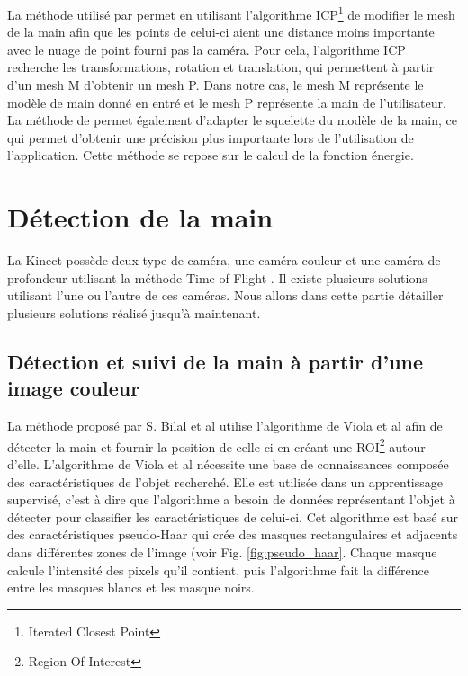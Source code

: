 La méthode utilisé par \cite{export:217428} permet en utilisant l'algorithme
ICP\footnote{Iterated Closest Point} \cite{121791} de modifier le mesh de la main afin
que les points de celui-ci aient une distance moins importante avec le nuage de point fourni pas la 
caméra. Pour cela, l'algorithme ICP recherche les transformations, rotation et translation, qui permettent 
à partir d'un mesh M d'obtenir un mesh P. Dans notre cas, le mesh M représente le modèle de main donné en entré
et le mesh P représente la main de l'utilisateur.\\ 

La méthode de \cite{export:217428} permet également d'adapter le squelette du modèle de la 
main, ce qui permet d'obtenir une précision plus importante lors de l'utilisation de l'application.
Cette méthode se repose sur le calcul de la fonction énergie.

\section{Détection de la main}

La Kinect possède deux type de caméra, une caméra couleur et une caméra de profondeur utilisant la méthode 
\og Time of Flight \fg. Il existe plusieurs solutions utilisant l'une ou l'autre de ces caméras. Nous allons
dans cette partie détailler plusieurs solutions réalisé jusqu'à maintenant.

\subsection{Détection et suivi de la main à partir d'une image couleur}
La méthode proposé par S. Bilal et al \cite{} utilise l'algorithme de Viola et al \cite{viola2001jones} afin
de détecter la main et fournir la position de celle-ci en créant une ROI\footnote{Region Of Interest} autour d'elle.
L'algorithme de Viola et al \cite{viola2001jones} nécessite une 
base de connaissances composée des caractéristiques de l'objet recherché. Elle est utilisée dans un 
apprentissage supervisé, c'est à dire que l'algorithme a besoin de données représentant
l'objet à détecter pour classifier les caractéristiques de celui-ci. Cet algorithme est basé sur des caractéristiques 
pseudo-Haar qui crée des masques rectangulaires et adjacents dans différentes zones de l'image (voir Fig. \ref{fig:pseudo_haar}. 
Chaque masque calcule l'intensité des pixels qu'il contient, puis l'algorithme fait la différence entre les masques blancs et les masque noirs.\\

